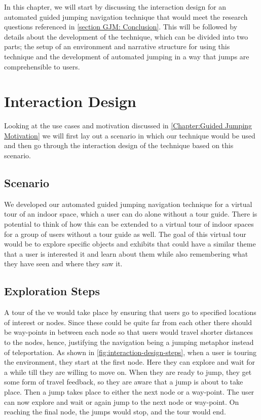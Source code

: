 \label{Chapter:Automated Guided Jumping}
In this chapter, we will start by discussing the interaction design for an automated guided jumping navigation technique that would meet the research questions referenced in \cref{section GJM: Conclusion}. This will be followed by details about the development of the technique, which can be divided into two parts; the setup of an environment and narrative structure for using this technique and the development of automated jumping in a way that jumps are comprehensible to users. 

\section{Interaction Design}
\label{section AGJ: Interaction Design}
Looking at the use cases and motivation discussed in \cref{Chapter:Guided Jumping Motivation} we will first lay out a scenario in which our technique would be used and then go through the interaction design of the technique based on this scenario.

\subsection{Scenario}
\label{subsection AGJ ID: Scenario}
We developed our automated guided jumping navigation technique for a virtual tour of an indoor space, which a user can do alone without a tour guide. There is potential to think of how this can be extended to a virtual tour of indoor spaces for a group of users without a tour guide as well. The goal of this virtual tour would be to explore specific objects and exhibits that could have a similar theme that a user is interested it and learn about them while also remembering what they have seen and where they saw it. 

\subsection{Exploration Steps}
\label{subsection AGJ ID: Exploration Steps}
A tour of the \acrshort{ve} would take place by ensuring that users go to specified locations of interest or nodes. Since these could be quite far from each other there should be way-points in between each node so that users would travel shorter distances to the nodes, hence, justifying the navigation being a jumping metaphor instead of teleportation. As shown in \cref{fig:interaction-design-steps}, when a user is touring the environment, they start at the first node. Here they can explore and wait for a while till they are willing to move on. When they are ready to jump, they get some form of travel feedback, so they are aware that a jump is about to take place. Then a jump takes place to either the next node or a way-point. The user can now explore and wait or again jump to the next node or way-point. On reaching the final node, the jumps would stop, and the tour would end. 

